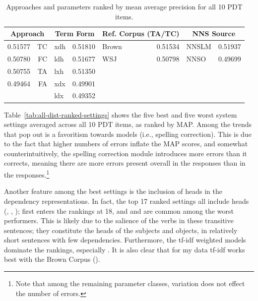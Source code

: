 \begin{table}
\begin{center}
\begin{tabular}{|l|r||l|r||l|r||l|r|}
\hline
\multicolumn{2}{|c||}{Approach} & \multicolumn{2}{|c||}{Term Form} & \multicolumn{2}{|c||}{Ref. Corpus (TA/TC)} & \multicolumn{2}{|c|}{NNS Source} \\
\hline
\hline
0.51577 & TC & xdh & 0.51810 & Brown & 0.51534 & NNSLM & 0.51937 \\
\hline
0.50780 & FC & ldh & 0.51677 & WSJ & 0.50798 & NNSO & 0.49699 \\
\hline
0.50755 & TA & lxh & 0.51350 & & & & \\
\hline
0.49464 & FA & xdx & 0.49901 & & & & \\
\hline
& 	& ldx & 0.49352 &  &  &  & \\
\hline
\end{tabular}
\caption{Approaches and parameters ranked by mean average precision for all 10 PDT items.}
\label{tab:dist-ranked-parameters}
\end{center}
\end{table}

Table~\ref{tab:all-dist-ranked-settings} shows the five best and five
worst system settings averaged across all 10 PDT items, as ranked by
MAP. Among the trends that pop out is a favoritism
towards  models (i.e., spelling correction). This is due
to the fact that higher numbers of errors inflate the MAP scores, and
somewhat counterintuitively, the spelling correction module introduces
more errors than it corrects, meaning there are more errors present
overall in the  responses than in the 
responses.\footnote{Note that among the remaining parameter classes,
variation does not effect the number of errors.}

Another feature among the best settings is the inclusion of heads in the dependency representations. In fact, the top 17 ranked settings all include heads (, , );  first enters the rankings at 18, and  and  are common among the worst performers. This is likely due to the salience of the verbs in these transitive sentences; they constitute the heads of the subjects and objects, in relatively short sentences with few dependencies.
Furthermore, the tf-idf weighted models dominate the rankings, especially . It is also clear that for my data tf-idf works best with the Brown Corpus ().


